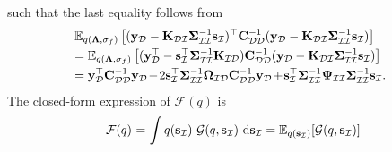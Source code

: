 \documentclass[conference]{IEEEtran}
\begin{document}
	such that the last equality follows from
	\begin{equation*}
		\hspace{-1.7mm}
		\begin{array}{l}
			\displaystyle\mathbb{E}_{q(\mathbf{\Lambda},\sigma_f)}\left[(\mathbf{y}_\mathcal{D}-\mathbf{K}_\mathcal{DI}\mathbf{\Sigma}_\mathcal{II}^{-1}\mathbf{s}_\mathcal{I})^\top\mathbf{C}_\mathcal{DD}^{-1}(\mathbf{y}_\mathcal{D}-\mathbf{K}_\mathcal{DI}\mathbf{\Sigma}_\mathcal{II}^{-1}\mathbf{s}_\mathcal{I})\right] \vspace{1mm}\\
			\displaystyle=\mathbb{E}_{q(\mathbf{\Lambda},\sigma_f)}\left[(\mathbf{y}_\mathcal{D}^\top-\mathbf{s}_\mathcal{I}^\top\mathbf{\Sigma}_\mathcal{II}^{-1}\mathbf{K}_\mathcal{ID})\mathbf{C}_\mathcal{DD}^{-1}(\mathbf{y}_\mathcal{D}-\mathbf{K}_\mathcal{DI}\mathbf{\Sigma}_\mathcal{II}^{-1}\mathbf{s}_\mathcal{I})\right] \vspace{1mm}\\
			\displaystyle=\mathbf{y}_\mathcal{D}^\top\mathbf{C}_\mathcal{DD}^{-1}\mathbf{y}_\mathcal{D}\hspace{-0.5mm}-\hspace{-0.5mm}2\mathbf{s}_\mathcal{I}^\top\mathbf{\Sigma}_\mathcal{II}^{-1}\mathbf{\Omega}_\mathcal{ID}\mathbf{C}_\mathcal{DD}^{-1}\mathbf{y}_\mathcal{D}\hspace{-0.5mm}+\hspace{-0.5mm}\mathbf{s}_\mathcal{I}^\top\mathbf{\Sigma}_\mathcal{II}^{-1}\mathbf{\Psi}_\mathcal{II}\mathbf{\Sigma}_\mathcal{II}^{-1}\mathbf{s}_\mathcal{I}.	
		\end{array}
	\end{equation*}
	The closed-form expression of $\mathcal{F}(q)$ is \vspace{-2mm}
	\begin{equation*}
		\vspace{-2mm}
		\begin{array}{rcl}
				\mathcal{F}(q)&\hspace{-2.4mm}=&\hspace{-2.4mm}\displaystyle\int q(\mathbf{s}_\mathcal{I})\ \mathcal{G}(q,\mathbf{s}_\mathcal{I})\ \mathrm{d}\mathbf{s}_\mathcal{I}
				=\displaystyle\mathbb{E}_{q(\mathbf{s}_\mathcal{I})}[\mathcal{G}(q,\mathbf{s}_\mathcal{I})] 
		\end{array}
	\end{equation*}
\end{document}
